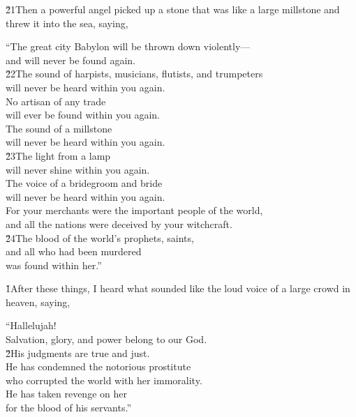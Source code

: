 \v{21}Then a powerful angel picked up a stone that was like a large millstone and threw it into the sea, saying,

\begin{poetry}
\poeml ``The great city Babylon will be thrown down violently--- \\
\poemll    and will never be found again. \\
\poeml \v{22}The sound of harpists, musicians, flutists, and trumpeters \\
\poemll    will never be heard within you again. \\
\poeml No artisan of any trade \\
\poemll    will ever be found within you again. \\
\poeml The sound of a millstone \\
\poemll    will never be heard within you again. \\
\poeml \v{23}The light from a lamp \\
\poemll    will never shine within you again. \\
\poeml The voice of a bridegroom and bride \\
\poemll    will never be heard within you again. \\
\poeml For your merchants were the important people of the world, \\
\poemll    and all the nations were deceived by your witchcraft. \\
\poeml \v{24}The blood of the world's prophets, saints, \\
\poemll    and all who had been murdered \\
\poemlll       was found within her.''
\end{poetry}

\v{1}After these things, I heard what sounded like the loud voice of a large crowd in heaven, saying,

\begin{poetry}
\poeml ``Hallelujah! \\
\poemll    Salvation, glory, and power belong to our God. \\
\poeml \v{2}His judgments are true and just. \\
\poemll    He has condemned the notorious prostitute \\
\poemlll       who corrupted the world with her immorality. \\
\poeml He has taken revenge on her \\
\poemll    for the blood of his servants.''
\end{poetry}

